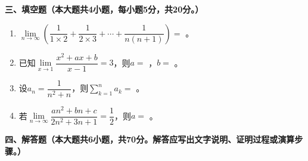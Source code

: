 \documentclass[12pt, a4paper]{ctexart}
\newcommand{\blank}[1]{\underline{\hspace{#1}}}
\begin{document}
\noindent\textbf{三、填空题（本大题共4小题，每小题5分，共20分。）}

\begin{enumerate}[start=13]
\item $\lim\limits_{n\to\infty}\left(\dfrac{1}{1\times2}+\dfrac{1}{2\times3}+\cdots+\dfrac{1}{n(n+1)}\right)=$ \blank{3cm}。

\item 已知$\lim\limits_{x\to 1}\dfrac{x^2+ax+b}{x-1}=3$，则$a=$ \blank{2cm}，$b=$ \blank{2cm}。

\item 设$a_n=\dfrac{1}{n^2+n}$，则$\sum\limits_{k=1}^{n}a_k=$ \blank{3cm}。

\item 若$\lim\limits_{n\to\infty}\dfrac{an^2+bn+c}{2n^2+3n+1}=\dfrac{1}{2}$，则$a=$ \blank{2cm}。
\end{enumerate}

\vspace{1em}

\noindent\textbf{四、解答题（本大题共6小题，共70分。解答应写出文字说明、证明过程或演算步骤。）}
\end{document}
